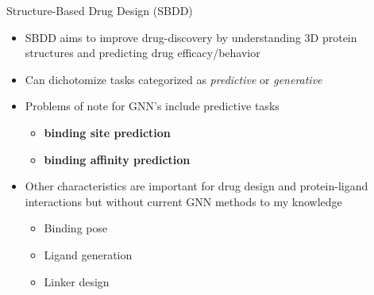 \documentclass{beamer}
\begin{document}

\begin{frame}{Structure-Based Drug Design (SBDD)}
    \begin{itemize}
        \item SBDD aims to improve drug-discovery by understanding 3D protein structures and predicting drug efficacy/behavior %
        \item Can dichotomize tasks categorized as \textit{predictive} or \textit{generative}
        \item Problems of note for GNN's include predictive tasks 
        \begin{itemize}
            \item \textbf{binding site prediction} 
            \item \textbf{binding affinity prediction}
        \end{itemize}
        \item Other characteristics are important for drug design and protein-ligand interactions but without current GNN methods to my knowledge 
        \begin{itemize}
            \item Binding pose 
            \item Ligand generation 
            \item Linker design 
        \end{itemize}
    \end{itemize}
\end{frame}
\end{document}
